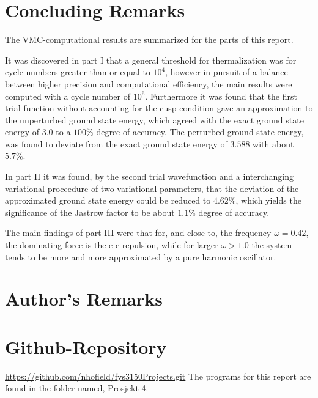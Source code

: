 \documentclass[aip,nobalancelastpage,
twocolumn,
rsi,%
 amsmath,amssymb,
 reprint,%
]{revtex4}
\begin{document}
\section{Concluding Remarks}
The VMC-computational results are summarized for the parts of this report.\par
It was discovered in part I that a general threshold for thermalization was for cycle numbers greater than or equal to $10^4$, however in pursuit of a balance between higher precision and computational efficiency, the main results were computed with a cycle number of $10^6$. Furthermore it was found that the first trial function without accounting for the cusp-condition gave an approximation to the unperturbed ground state energy, which agreed with the exact ground state energy of $3.0$ to a $100\%$ degree of accuracy. The perturbed ground state energy, was found to deviate from the exact ground state energy of $3.588$ with about $5.7\%$.\par
In part II it was found, by the second trial wavefunction and a interchanging variational proceedure of two variational parameters, that the deviation of the approximated ground state energy could be reduced to $4.62\%$, which yields the significance of the Jastrow factor to be about $1.1\%$ degree of accuracy.\par
The main findings of part III were that for, and close to, the frequency $\omega=0.42$, the dominating force is the e-e repulsion, while for larger $\omega>1.0$ the system tends to be more and more approximated by a pure harmonic oscillator.

\section{Author's Remarks}


\section{Github-Repository}
\url{https://github.com/nhofield/fys3150Projects.git}
The programs for this report are found in the folder named, Prosjekt 4.
\end{document}
